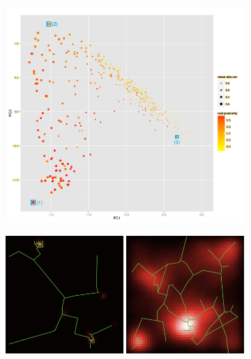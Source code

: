 \begin{figure}
\begin{subfigure}[t]{0.54\linewidth}
\includegraphics[width=\textwidth]{figures/pca_realDistCol_meanAbsCorSize_withSpecificPoints}
\caption{}
\end{subfigure}
\begin{subfigure}[t]{0.45\linewidth}
\vspace{-8.3cm}
   \includegraphics[width=0.49\textwidth]{figures/configs/1_param71861_seed0}
   \includegraphics[width=0.49\textwidth]{figures/configs/2_param71913_seed10}\\

\end{subfigure}
\end{figure}

